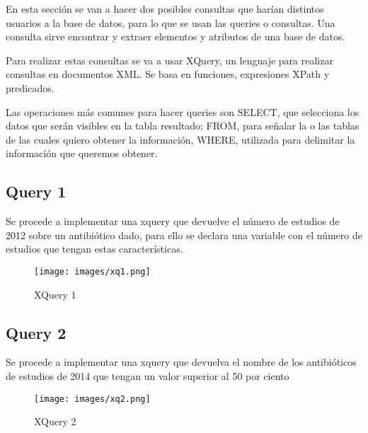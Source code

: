 \documentclass[../main.tex]{subfiles}
\begin{document}
En esta sección se van a hacer dos posibles consultas que harían distintos usuarios a la base de datos, para lo que se usan las queries o consultas. Una consulta sirve encontrar y extraer elementos y atributos de una base de datos.

\hfill

Para realizar estas consultas se va a usar XQuery, un lenguaje para realizar consultas en documentos XML. Se basa en funciones, expresiones XPath y predicados.

\hfill

Las operaciones más comunes para hacer queries son SELECT, que selecciona los datos que serán visibles en la tabla resultado; FROM, para señalar la o las tablas de las cuales quiero obtener la información, WHERE, utilizada para delimitar la información que queremos obtener.

\subsection{Query 1}

Se procede a implementar una xquery que devuelve el número de estudios de 2012 sobre un antibiótico dado, para ello se declara una variable con el número de estudios que tengan estas características.

\begin{figure}[ht]
    \centering
    \texttt{[image: images/xq1.png]}
    \caption{XQuery 1}
    \label{xq1}
\end{figure}

\newpage

\subsection{Query 2}

Se procede a implementar una xquery que devuelva el nombre de los antibióticos de estudios de 2014 que tengan un valor superior al 50 por ciento

\begin{figure}[ht]
    \centering
    \texttt{[image: images/xq2.png]}
    \caption{XQuery 2}
    \label{xq2}
\end{figure}
\end{document}
